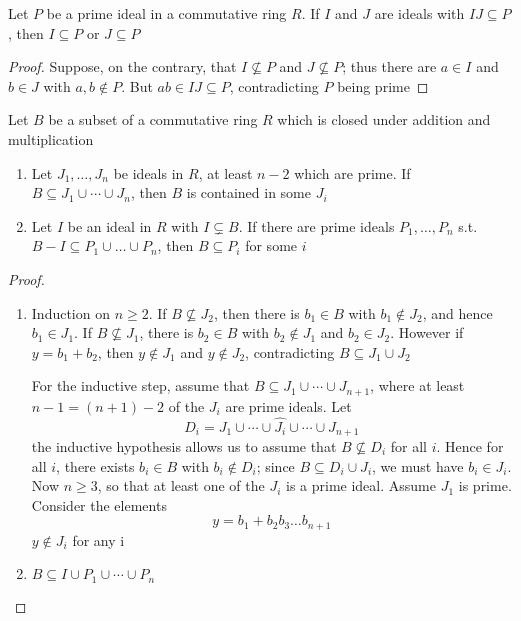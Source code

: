 \documentclass[11pt]{article}
\begin{document}
\begin{proposition}[]
Let \(P\) be a prime ideal in a commutative ring \(R\). If \(I\) and \(J\) are ideals
with \(IJ\subseteq P\), then \(I\subseteq P\) or \(J\subseteq P\)
\end{proposition}

\begin{proof}
Suppose, on the contrary, that \(I\not\subseteq P\) and \(J\not\subseteq P\);
thus there are \(a\in I\) and \(b\in J\) with \(a,b\not\in P\). But 
\(ab\in IJ\subseteq P\), contradicting \(P\) being prime
\end{proof}

\begin{proposition}[]
Let \(B\) be a subset of a commutative ring \(R\) which is closed under addition
and multiplication
\begin{enumerate}
\item Let \(J_1,\dots,J_n\) be ideals in \(R\), at least \(n-2\) which are prime.
If \(B\subseteq J_1\cup\cdots\cup J_n\), then \(B\) is contained in some
\(J_i\)
\item Let \(I\) be an ideal in \(R\) with \(I\subsetneq B\). If there are prime
ideals \(P_1,\dots,P_n\) s.t. \(B-I\subseteq P_1\cup\dots\cup P_n\), then 
\(B\subseteq P_i\) for some \(i\)
\end{enumerate}
\end{proposition}

\begin{proof}
\begin{enumerate}
\item Induction on \(n\ge2\). If \(B\not\subseteq J_2\), then there is \(b_1\in B\)
with \(b_1\not\in J_2\), and hence \(b_1\in J_1\). If \(B\not\subseteq J_1\),
there is \(b_2\in B\) with \(b_2\not\in J_1\) and \(b_2\in J_2\). However if
\(y=b_1+b_2\), then \(y\not\in J_1\) and \(y\not\in J_2\), contradicting 
\(B\subseteq J_1\cup J_2\)

For the inductive step, assume that \(B\subseteq J_1\cup\cdots\cup J_{n+1}\),
where at least \(n-1=(n+1)-2\) of the \(J_i\) are prime ideals. Let
\begin{equation*}
D_i=J_1\cup\cdots\cup\widehat{J_i}\cup\cdots\cup J_{n+1}
\end{equation*}
the inductive hypothesis allows us to assume that \(B\not\subseteq D_i\) for
all \(i\). Hence for all \(i\), there exists \(b_i\in B\) with 
\(b_i\not\in D_i\); since \(B\subseteq D_i\cup J_i\), we must have 
\(b_i\in J_i\). Now \(n\ge3\), so that at least one of the \(J_i\) is a prime
ideal. Assume \(J_1\) is prime. Consider the elements
\begin{equation*}
y=b_1+b_2b_3\dots b_{n+1}
\end{equation*}
\(y\not\in J_i\) for any i
\item \(B\subseteq I\cup P_1\cup\cdots\cup P_n\)
\end{enumerate}
\end{proof}
\end{document}
